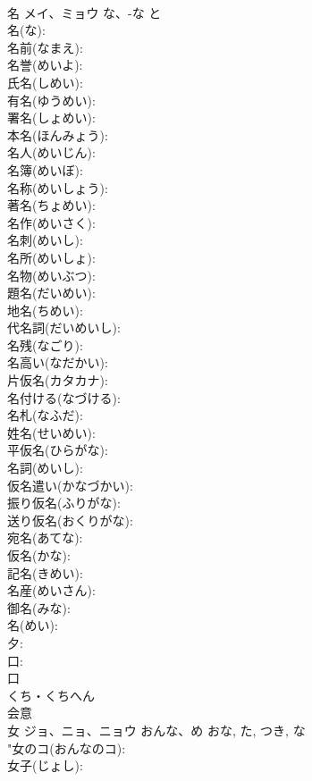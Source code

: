\documentclass[8pt]{extreport}
\begin{document}
\begin{CJK}{UTF8}{min}
\\	名	メイ、ミョウ	な、-な	と	
\\	名(な): 
\\	名前(なまえ): 
\\	名誉(めいよ): 
\\	氏名(しめい): 
\\	有名(ゆうめい): 
\\	署名(しょめい): 
\\	本名(ほんみょう): 
\\	名人(めいじん): 
\\	名簿(めいぼ): 
\\	名称(めいしょう): 
\\	著名(ちょめい): 
\\	名作(めいさく): 
\\	名刺(めいし): 
\\	名所(めいしょ): 
\\	名物(めいぶつ): 
\\	題名(だいめい): 
\\	地名(ちめい): 
\\	代名詞(だいめいし): 
\\	名残(なごり): 
\\	名高い(なだかい): 
\\	片仮名(カタカナ): 
\\	名付ける(なづける): 
\\	名札(なふだ): 
\\	姓名(せいめい): 
\\	平仮名(ひらがな): 
\\	名詞(めいし): 
\\	仮名遣い(かなづかい): 
\\	振り仮名(ふりがな): 
\\	送り仮名(おくりがな): 
\\	宛名(あてな): 
\\	仮名(かな): 
\\	記名(きめい): 
\\	名産(めいさん): 
\\	御名(みな): 
\\	名(めい): 
\\	夕: 
\\	口: 
\\	口	
\\	くち・くちへん	
\\	会意 
\\	女	ジョ、ニョ、ニョウ	おんな、め	おな, た, つき, な	
\\	"女のコ(おんなのコ): 
\\	女子(じょし): 

\end{CJK}
\end{document}
